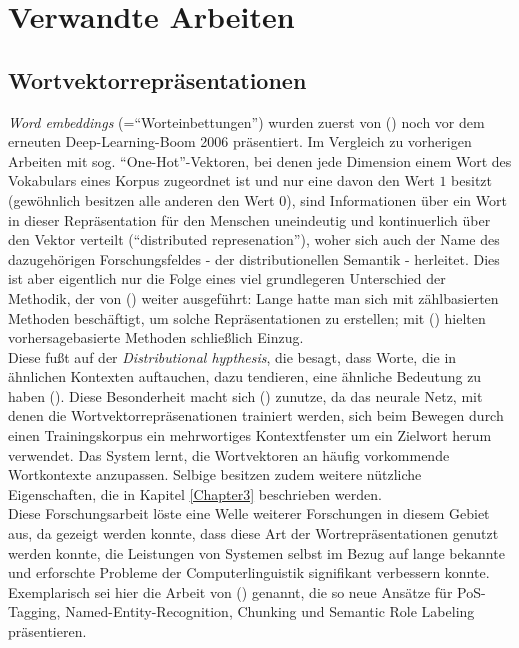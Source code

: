 
\chapter{Verwandte Arbeiten} %

\label{Chapter2} %


\section{Wortvektorrepräsentationen}

\emph{Word embeddings} (=``Worteinbettungen'') wurden zuerst von (\cite{bengio2006neural}) noch vor dem erneuten
Deep-Learning-Boom 2006 präsentiert. Im Vergleich zu vorherigen Arbeiten mit sog. ``One-Hot''-Vektoren, bei denen
jede Dimension einem Wort des Vokabulars eines Korpus zugeordnet ist und nur eine davon den Wert $1$ besitzt (gewöhnlich
besitzen alle anderen den Wert $0$), sind Informationen über ein Wort in dieser Repräsentation für den Menschen uneindeutig
und kontinuerlich über den Vektor verteilt (``distributed represenation''), woher sich auch der Name des dazugehörigen
Forschungsfeldes - der distributionellen Semantik - herleitet. Dies ist aber eigentlich nur die Folge eines viel
grundlegeren Unterschied der Methodik, der von (\cite{baroni2014don}) weiter ausgeführt: Lange hatte man sich
mit zählbasierten Methoden beschäftigt, um solche Repräsentationen zu erstellen; mit (\cite{bengio2006neural}) hielten
vorhersagebasierte Methoden schließlich Einzug. \\
Diese fußt auf der \emph{Distributional hypthesis}, die besagt, dass Worte, die in ähnlichen Kontexten auftauchen, dazu tendieren, eine ähnliche Bedeutung zu haben (\cite{harris1954distributional}).
Diese Besonderheit macht sich (\cite{bengio2006neural}) zunutze, da das neurale Netz, mit denen die Wortvektorrepräsenationen
trainiert werden, sich beim Bewegen durch einen Trainingskorpus ein mehrwortiges Kontextfenster um ein Zielwort herum
verwendet. Das System lernt, die Wortvektoren an häufig vorkommende Wortkontexte anzupassen. Selbige besitzen zudem
weitere nützliche Eigenschaften, die in Kapitel \ref{Chapter3} beschrieben werden.\\
Diese Forschungsarbeit löste eine Welle weiterer Forschungen in diesem Gebiet aus, da gezeigt werden konnte, dass diese
Art der Wortrepräsentationen genutzt werden konnte, die Leistungen von Systemen selbst im Bezug auf lange bekannte und
erforschte Probleme der Computerlinguistik signifikant verbessern konnte. Exemplarisch sei hier die Arbeit von
(\cite{collobert2011natural}) genannt, die so neue Ansätze für PoS-Tagging, Named-Entity-Recognition, Chunking und Semantic
Role Labeling präsentieren.\\

